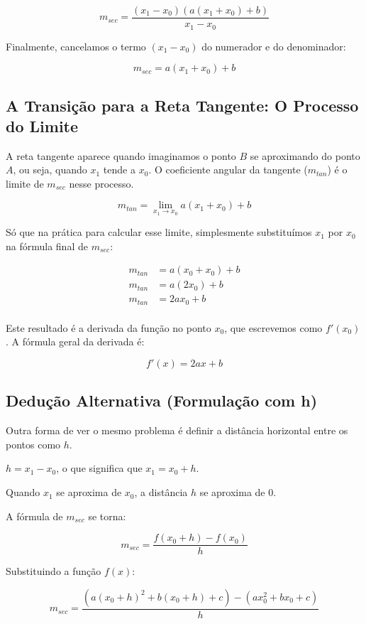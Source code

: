 \documentclass[../resumo.tex]{subfiles}
\begin{document}
	\[ m_{sec} = \frac{(x_1 - x_0)(a(x_1 + x_0) + b)}{x_1 - x_0} \]

	Finalmente, cancelamos o termo $(x_1 - x_0)$ do numerador e do denominador:

	\[ m_{sec} = a(x_1 + x_0) + b \]

	\subsection{A Transição para a Reta Tangente: O Processo do Limite}

	A reta tangente aparece quando imaginamos o ponto $B$ se aproximando do ponto $A$, ou seja,
	quando $x_1$ tende a $x_0$. O coeficiente angular da tangente ($m_{tan}$) é o limite de $m_{sec}$ nesse processo.

	\[ m_{tan} = \lim_{x_1\to x_0} a(x_1 + x_0) + b \]

	Só que na prática para calcular esse limite, simplesmente substituímos $x_1$ por $x_0$ na fórmula final de $m_{sec}$:

	\begin{align*}
		m_{tan} &= a(x_0 + x_0) + b \\
		m_{tan} &= a(2x_0) + b \\
		m_{tan} &= 2ax_0 + b \\
	\end{align*}

	Este resultado é a derivada da função no ponto $x_0$, que escrevemos como $f'(x_0)$. A fórmula geral da derivada é:

	\[ f'(x) = 2ax + b \]

	\subsection{Dedução Alternativa (Formulação com h)}

	Outra forma de ver o mesmo problema é definir a distância horizontal entre os pontos como $h$.

	$h = x_1 - x_0$, o que significa que $x_1 = x_0 + h$.

	Quando $x_1$ se aproxima de $x_0$, a distância $h$ se aproxima de $0$.

	A fórmula de $m_{sec}$ se torna:

	\[ m_{sec} = \frac{f(x_0 + h) - f(x_0)}{h} \]

	Substituindo a função $f(x)$:

	\[ m_{sec} = \frac{(a(x_0 + h)^2 + b(x_0 + h) + c) - (ax_0^2 + bx_0 + c)}{h} \]
\end{document}
